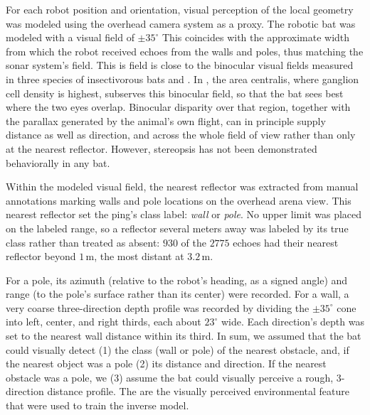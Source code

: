 \documentclass[11pt]{article}
\newcommand{\dgm}{^{\circ}}
\begin{document}
For each robot position and orientation, visual perception of the local geometry was modeled using the overhead camera system as a proxy. The robotic bat was modeled with a visual field of $\pm35\dgm$ This coincides with the approximate width from which the robot received echoes from the walls and poles, thus matching the sonar system's field. This is field is close to the binocular visual fields measured in three species of insectivorous bats \citep[$19\dgm-50\dgm$,][]{Bell1986} and  \cite[$40\dgm$,][]{Hoffmann2016}. In , the area centralis, where ganglion cell density is highest, subserves this binocular field, so that the bat sees best where the two eyes overlap. Binocular disparity over that region, together with the parallax generated by the animal's own flight, can in principle supply distance as well as direction, and across the whole field of view rather than only at the nearest reflector. However, stereopsis has not been demonstrated behaviorally in any bat. 

Within the modeled visual field, the nearest reflector was extracted from manual annotations marking walls and pole locations on the overhead arena view. This nearest reflector set the ping's class label: \emph{wall} or \emph{pole}. No upper limit was placed on the labeled range, so a reflector several meters away was labeled by its true class rather than treated as absent: $930$ of the $2775$ echoes had their nearest reflector beyond $1$\,m, the most distant at $3.2$\,m. 

%
%
For a pole, its azimuth (relative to the robot's heading, as a signed angle) and range (to the pole's surface rather than its center) were recorded. For a wall, a very coarse three-direction depth profile was recorded by dividing the $\pm 35\dgm$ cone into left, center, and right thirds, each about $23\dgm$ wide. Each direction's depth was set to the nearest wall distance within its third. In sum, we assumed that the bat could visually detect (1) the class (wall or pole) of the nearest obstacle, and, if the nearest object was a pole (2) its distance and direction. If the nearest obstacle was a pole, we (3) assume the bat could visually perceive a rough, 3-direction distance profile. The are the visually perceived environmental feature that were used to train the inverse model. 
\end{document}
